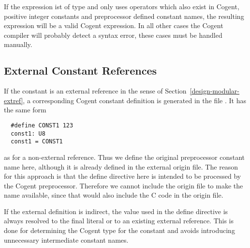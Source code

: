 If the expression ist of type  and only uses operators which also exist in Cogent, positive integer constants 
and preprocessor defined constant names, the resulting expression will be a valid Cogent expression. In all other cases
the Cogent compiler will probably detect a syntax error, these cases must be handled manually.

\subsection{External Constant References}

If the constant  is an external reference in the sense of Section~\ref{design-modular-extref}, a corresponding
Cogent constant definition is generated in the file . It has the same form
\begin{verbatim}
  #define CONST1 123
  const1: U8
  const1 = CONST1
\end{verbatim}
as for a non-external reference. Thus we define the original preprocessor constant name  here, although
it is already defined in the external origin file. The reason for this approach is that the define directive here 
is intended to be processed by the Cogent preprocessor. Therefore we cannot include the origin file to make the name
available, since that would also include the C code in the origin file.

If the external definition is indirect, the value used in the define directive is always resolved to the final
literal or to an existing external reference. This is done for determining the Cogent type for the constant 
and avoids introducing unnecessary intermediate constant names.

